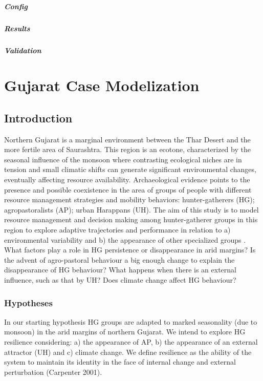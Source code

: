 \documentclass{report}
\begin{document}
			\paragraph{Config}
			\paragraph{Results}
			\paragraph{Validation}
	
\newpage 
\chapter{Gujarat Case Modelization}
	\section{Introduction}
Northern Gujarat is a marginal environment between the Thar Desert and the more fertile area of Saurashtra. This region is an ecotone, characterized by the seasonal influence of the monsoon where contrasting ecological niches are in tension and small climatic shifts can generate significant environmental changes, eventually affecting  resource availability. Archaeological evidence points to the presence and possible coexistence in the area of groups of people with different resource management strategies and mobility behaviors: hunter-gatherers (HG); agropastoralists (AP); urban Harappans (UH).
The aim of this study is to model resource management and decision making among hunter-gatherer groups in this region to explore adaptive trajectories and performance in relation to a) environmental variability and b) the appearance of other specialized groups . 
What factors play a role in HG persistence or disappearance in arid margins? Is the advent of agro-pastoral behaviour a big enough change to explain the disappearance of HG behaviour? What happens when there is an external influence, such as that by UH? Does climate change affect HG behaviour?
	    \subsection{Hypotheses}
In our starting hypothesis HG groups are adapted to marked seasonality (due to monsoon) in the arid margins of northern Gujarat. We intend to explore HG resilience considering: a) the appearance of AP, b) the appearance of an external attractor (UH) and c) climate change. We define resilience as the ability of the system to maintain its identity in the face of internal change and external perturbation (Carpenter 2001).
\end{document}
